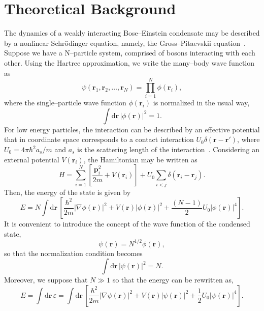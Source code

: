 \section{Theoretical Background}
The dynamics of a weakly interacting Bose--Einstein condensate may be described by a nonlinear Schr\"odinger equation, namely, the Gross--Pitaevskii equation~\citep{pethick2002bose,DGPS99,LSA12}. Suppose we have a N--particle system, comprised of bosons interacting with each other. Using the Hartree approximation, we write the many--body wave function as
\begin{equation}
\psi(\textbf{r}_1, \textbf{r}_2,\ldots, \textbf{r}_N) = \prod_{i=1}^N \phi(\textbf{r}_i),
\end{equation}
where the single--particle wave function $\phi(\textbf{r}_i)$ is normalized in the usual way,
\begin{equation}
\int \mathrm{d}\textbf{r} \, |\phi(\textbf{r})|^2 = 1.
\end{equation} 
For low energy particles, the interaction can be described by an effective potential
that in coordinate space corresponds to a contact interaction $U_0 \delta(\textbf{r} - \textbf{r}')$, where $U_0 = 4 \pi \hbar^2 a_s / m$ and $a_s$ is the scattering length of the interaction~\citep{pethick2002bose}. Considering an external potential $V(\textbf{r}_i)$, the Hamiltonian may be written as
\begin{equation}
H = \sum_{i=1}^N \left[ \frac{\textbf{p}_i^2}{2 m} + V(\textbf{r}_i) \right] + U_0 \sum_{i<j} \delta(\textbf{r}_i - \textbf{r}_j).
\end{equation}
Then, the energy of the state is given by
\begin{equation}
E =  N \int \mathrm{d} \textbf{r} \, \left[ \frac{\hbar^2}{2m} |\nabla \phi(\textbf{r}) |^2 + V(\textbf{r}) |\phi(\textbf{r})|^2 + \frac{(N-1)}{2} U_0 |\phi(\textbf{r})|^4 \right].
\end{equation} 
It is convenient to introduce the concept of the wave function of the condensed state,
\begin{equation}
\psi(\textbf{r}) = N^{1/2} \phi(\textbf{r}),
\end{equation}
so that the normalization condition becomes
\begin{equation} \label{eq:normalization-N}
\int \mathrm{d}\textbf{r} \, |\psi(\textbf{r})|^2 = N.
\end{equation}
Moreover, we suppose that $N \gg 1$ so that the energy can be rewritten as,
\begin{equation}
E = \int \mathrm{d} \textbf{r} \, \varepsilon  = \int \mathrm{d} \textbf{r} \, \left[ \frac{\hbar^2}{2m} |\nabla \psi(\textbf{r}) |^2 + V(\textbf{r}) |\psi(\textbf{r})|^2 + \frac{1}{2} U_0 |\psi(\textbf{r})|^4 \right].
\end{equation}
